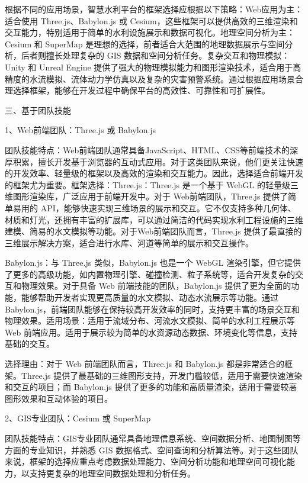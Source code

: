 根据不同的应用场景，智慧水利平台的框架选择应根据以下策略：Web应用为主：适合使用 Three.js、Babylon.js 或 Cesium，这些框架可以提供高效的三维渲染和交互能力，特别适用于简单的水利设施展示和数据可视化。地理空间分析为主：Cesium 和 SuperMap 是理想的选择，前者适合大范围的地理数据展示与空间分析，后者则擅长处理复杂的 GIS 数据和空间分析任务。复杂交互和物理模拟：Unity 和 Unreal Engine 提供了强大的物理模拟能力和图形渲染技术，适合用于高精度的水流模拟、流体动力学仿真以及复杂的灾害预警系统。通过根据应用场景合理选择框架，能够在开发过程中确保平台的高效性、可靠性和可扩展性。

三、基于团队技能

1、Web前端团队：Three.js 或 Babylon.js

团队技能特点：Web前端团队通常具备JavaScript、HTML、CSS等前端技术的深厚积累，擅长开发基于浏览器的互动式应用。对于这类团队来说，他们更关注快速的开发效率、轻量级的框架以及高效的渲染和交互能力。因此，选择适合前端开发的框架尤为重要。框架选择：Three.js：Three.js 是一个基于 WebGL 的轻量级三维图形渲染库，广泛应用于前端开发中。对于 Web前端团队，Three.js 提供了简单易用的 API，能够快速实现三维场景的展示和交互。它不仅支持多种几何体、材质和灯光，还拥有丰富的扩展库，可以通过简洁的代码实现水利工程设施的三维建模、简易的水文模拟等功能。对于Web前端团队而言，Three.js 提供了最直接的三维展示解决方案，适合进行水库、河道等简单的展示和交互操作。

Babylon.js：与 Three.js 类似，Babylon.js 也是一个 WebGL 渲染引擎，但它提供了更多的高级功能，如内置物理引擎、碰撞检测、粒子系统等，适合开发复杂的交互和物理效果。对于具备 Web 前端技能的团队，Babylon.js 提供了更为全面的功能，能够帮助开发者实现更高质量的水文模拟、动态水流展示等功能。通过 Babylon.js，前端团队能够在保持较高开发效率的同时，支持更丰富的场景交互和物理效果。适用场景：适用于流域分布、河流水文模拟、简单的水利工程展示等 Web 前端应用。适用于展示较为简单的水资源动态数据、环境变化等信息，支持基础的交互。

选择理由：对于 Web 前端团队而言，Three.js 和 Babylon.js 都是非常适合的框架。Three.js 提供了最基础的三维图形支持，开发门槛较低，适用于需要快速渲染和交互的项目；而 Babylon.js 提供了更多的功能和高质量渲染，适用于需要较高图形效果和互动体验的项目。

2、GIS专业团队：Cesium 或 SuperMap

团队技能特点：GIS专业团队通常具备地理信息系统、空间数据分析、地图制图等方面的专业知识，并熟悉 GIS 数据格式、空间查询和分析算法等。对于这些团队来说，框架的选择应重点考虑数据处理能力、空间分析功能和地理空间可视化能力，以支持更复杂的地理空间数据处理和分析任务。

